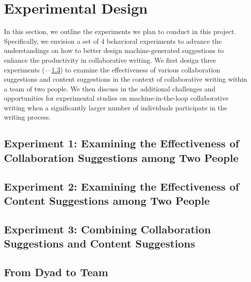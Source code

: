 
\section{Experimental Design}

In this section, we outline the experiments we plan to conduct in this project. Specifically, we envision a set of 4 behavioral experiments to advance the understandings on how to better design machine-generated suggestions to enhance the productivity in collaborative writing. We first design three experiments (---\ref{sec:exp3}) to examine the effectiveness of various collaboration suggestions and content suggestions in the context of collaborative writing within a team of two people. We then discuss in  the additional challenges and opportunities for experimental studies on machine-in-the-loop collaborative writing when a significantly larger number of individuals participate in the writing process.

\subsection{Experiment 1: Examining the Effectiveness of Collaboration Suggestions among Two People}
\label{sec:exp1}

\subsection{Experiment 2: Examining the Effectiveness of Content Suggestions among Two People}
\label{sec:exp2}

\subsection{Experiment 3: Combining Collaboration Suggestions and Content Suggestions}
\label{sec:exp3}


\subsection{From Dyad to Team}
\label{sec:exp4}